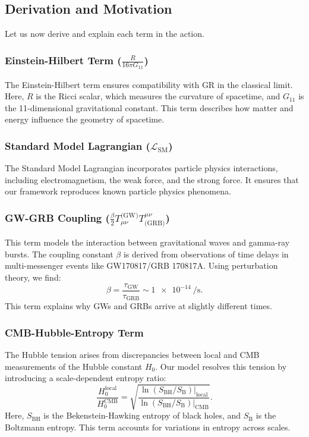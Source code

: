 \documentclass[12pt, a4paper]{article}
\begin{document}
\subsection{Derivation and Motivation}
Let us now derive and explain each term in the action.

\subsubsection{Einstein-Hilbert Term ($\frac{R}{16\pi G_{11}}$)}
The Einstein-Hilbert term ensures compatibility with GR in the classical limit. Here, $R$ is the Ricci scalar, which measures the curvature of spacetime, and $G_{11}$ is the 11-dimensional gravitational constant. This term describes how matter and energy influence the geometry of spacetime.

\subsubsection{Standard Model Lagrangian ($\mathcal{L}_{\text{SM}}$)}
The Standard Model Lagrangian incorporates particle physics interactions, including electromagnetism, the weak force, and the strong force. It ensures that our framework reproduces known particle physics phenomena.

\subsubsection{GW-GRB Coupling ($\frac{\beta}{2} T_{\mu\nu}^{\text{(GW)}} T^{\mu\nu}_{\text{(GRB)}}$)}
This term models the interaction between gravitational waves and gamma-ray bursts. The coupling constant $\beta$ is derived from observations of time delays in multi-messenger events like GW170817/GRB 170817A. Using perturbation theory, we find:
\[
\beta = \frac{\tau_{\text{GW}}}{\tau_{\text{GRB}}} \sim \SI{1e-14}{\per\second}.
\]
This term explains why GWs and GRBs arrive at slightly different times.

\subsubsection{CMB-Hubble-Entropy Term}
The Hubble tension arises from discrepancies between local and CMB measurements of the Hubble constant $H_0$. Our model resolves this tension by introducing a scale-dependent entropy ratio:
\[
\frac{H_0^{\text{local}}}{H_0^{\text{CMB}}} = \sqrt{\frac{\ln(S_{\text{BH}}/S_{\text{B}})|_{\text{local}}}{\ln(S_{\text{BH}}/S_{\text{B}})|_{\text{CMB}}}}.
\]
Here, $S_{\text{BH}}$ is the Bekenstein-Hawking entropy of black holes, and $S_{\text{B}}$ is the Boltzmann entropy. This term accounts for variations in entropy across scales.
\end{document}
